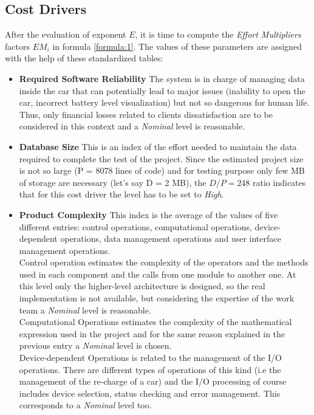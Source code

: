 \documentclass[11pt,a4paper]{report}
\begin{document}
\subsection{Cost Drivers}
After the evaluation of exponent $E$, it is time to compute the \textit{Effort Multipliers} factors $EM_i$ in formula \ref{formula:1}. The values of these parameters are assigned with the help of these standardized tables:
\begin{itemize}
	\item \textbf{Required Software Reliability}
The system is in charge of managing data inside the car that can potentially lead to major issues (inability to open the car, incorrect battery level visualization) but not so dangerous for human life. Thus, only financial losses related to clients dissatisfaction are to be considered in this context and a \textit{Nominal} level is reasonable.
\newpage 
	\item \textbf{Database Size}
This is an index of the effort needed to maintain the data required to complete the test of the project. Since the estimated project size is not so large (P = 8078 lines of code) and for testing purpose only few MB of storage are necessary (let's say D = 2 MB),  the $D/P = 248$  ratio indicates that for this cost driver the level has to be set to \textit{High}.
	\item \textbf{Product Complexity}
This index is the average of the values of five different entries: control operations, computational operations, device-dependent operations, data management operations and user interface management operations.\\
Control operation estimates the complexity of the operators and the methods used in each component and the calls from one module to another one. At this level only the higher-level architecture is designed, so the real implementation is not available, but considering the expertise of the work team a \textit{Nominal} level is reasonable.\\Computational Operations estimates the complexity of the mathematical expression used in the project and for the same reason explained in the previous entry a \textit{Nominal} level is chosen.\\
Device-dependent Operations is related to the management of the I/O operations. There are different types of operations of this kind (i.e the management of the re-charge of a car) and the I/O processing of course includes device selection, status checking and error management. This corresponds to a \textit{Nominal} level too.\\

\end{itemize}
\end{document}
